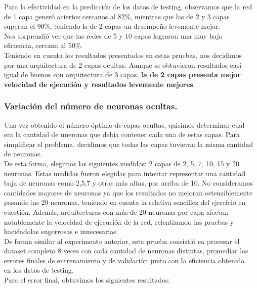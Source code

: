 Para la efectividad en la predicción de los datos de testing, observamos que la red de 1 capa generó aciertos cercanos al 82\%, mientras que las de 2 y 3 capas superan el 90\%, teniendo la de 2 capas un desempeño levemente mejor.\\
Nos sorprendíó ver que las redes de 5 y 10 capas lograron una muy baja eficiencia, cercana al 50\%.\\

Teniendo en cuenta los resultados presentados en estas pruebas, nos decidimos por una arquitectura de 2 capas ocultas. Aunque se obtuvieron resultados casi igual de buenos con arquitectura de 3 capas, \textbf{la de 2 capas presenta mejor velocidad de ejecución y resultados levemente mejores}.\\

\newpage

\subsubsection{Variación del número de neuronas ocultas.}

Una vez obtenido el número óptimo de capas ocultas, quisimos determinar cual era la cantidad de nueronas que debía contener
cada una de estas capas. Para simplificar el problema, decidimos que todas las capas tuvieran la misma cantidad de neuronas.\\
De esta forma, elegimos las siguientes medidas: 2 capas de 2, 5, 7, 10, 15 y 20 neuronas. Estas medidas fueron elegidas para intentar representar una cantidad baja de neuronas como 2,5,7 y otras más altas, por arriba de 10. No consideramos cantidades mayores de neuronas ya que los resultados no mejoran ostensiblemente pasando las 20 neuronas, teniendo en cuenta la relativa
sencillez del ejercicio en cuestión. Además, arquitecturas con más de 20 neuronas por capa afectan notablemente la velocidad de ejecución de la red, relentizando las pruebas y haciéndolas engorrosas e innecesarias.\\

De forma similar al experimento anterior, esta prueba consistió en procesar el dataset completo 8 veces con cada cantidad de neuronas distintas, promediar los errores finales de entrenamiento y de validación junto con la eficiencia obtenida en los datos de testing.\\
Para el error final, obtuvimos los siguientes resultados:\\

